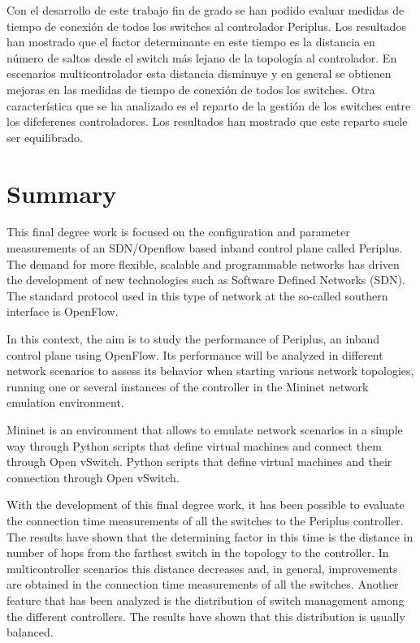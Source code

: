 \documentclass[a4paper, 12pt]{book}
\begin{document}
	Con el desarrollo de este trabajo fin de grado se han podido evaluar medidas de tiempo de conexión de todos los
	switches al controlador Periplus. Los resultados han mostrado que el factor determinante en este tiempo
	es la distancia en número de saltos desde el switch más lejano de la topología al controlador. En escenarios
	multicontrolador esta distancia disminuye y en general se obtienen mejoras en las medidas de tiempo
	de conexión de todos los switches. Otra característica que se ha analizado es el reparto de la gestión de los
	switches entre los difeferenes controladores. Los resultados han mostrado que este reparto suele ser equilibrado.
	
	
	\chapter*{Summary}
	
This final degree work is focused on the configuration and parameter measurements of an SDN/Openflow based inband control plane called Periplus. The demand for more flexible, scalable and programmable networks has driven the development of new technologies such as Software Defined Networks (SDN). The standard protocol used in this type of network at the so-called southern interface is
OpenFlow. 

In this context, the aim is to study the performance of Periplus, an inband control plane using OpenFlow. Its performance will be analyzed in different network scenarios to assess its behavior when starting various network topologies, running one or several instances of the controller in the Mininet network emulation environment.

Mininet is an environment that allows to emulate network scenarios in a simple way through Python scripts that define virtual machines and connect them through Open vSwitch. Python scripts that define virtual machines and their connection through Open vSwitch.


With the development of this final degree work, it has been possible to evaluate the connection time measurements of all the switches to the Periplus controller. The results have shown that the determining factor in this time is the distance in number of hops from the farthest switch in the topology to the controller. In multicontroller scenarios this distance decreases and, in general, improvements are obtained in the connection time measurements of all the switches. 
Another feature that has been analyzed is the distribution of switch management among the different controllers. The results have shown that this distribution is usually balanced.
\end{document}
